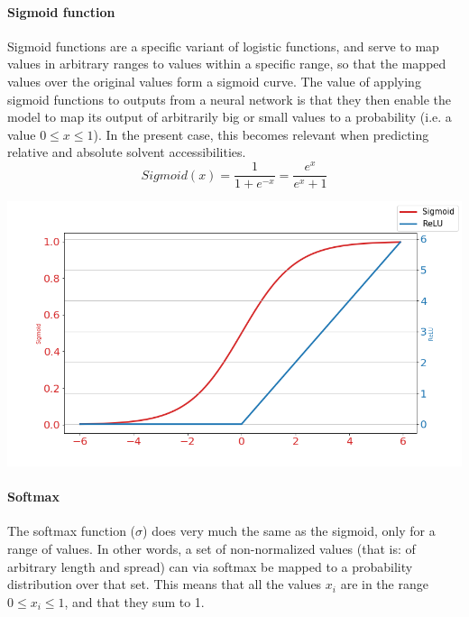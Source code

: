 \paragraph{Sigmoid function}
Sigmoid functions are a specific variant of logistic functions, and serve to map values in arbitrary ranges to values within a specific range, so that the mapped values over the original values form a sigmoid curve. The value of applying sigmoid functions to outputs from a neural network is that they then enable the model to map its output of arbitrarily big or small values to a probability (i.e. a value $0\leq x \leq 1$). In the present case, this becomes relevant when predicting relative and absolute solvent accessibilities.
\[
Sigmoid(x) = \frac{1}{1 + e^{-x}} = \frac{e^x}{e^x +1}
\]

\begin{Figure}
 \centering
 \includegraphics[width=\linewidth]{../graphs/activation.png}
\end{Figure}



\paragraph{Softmax}
The softmax function ($\sigma$) does very much the same as the sigmoid, only for a range of values. In other words, a set of non-normalized values (that is: of arbitrary length and spread) can via softmax be mapped to a probability distribution over that set. This means that all the values $x_i$ are in the range $0\leq x_i \leq 1$, and that they sum to 1.

